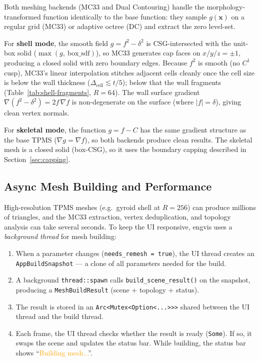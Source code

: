 \documentclass[11pt]{article}
\begin{document}
Both meshing backends (MC33 and Dual Contouring) handle the
morphology-transformed function identically to the base function:
they sample $g(\mathbf{x})$ on a regular grid (MC33) or adaptive
octree (DC) and extract the zero level-set.

For \textbf{shell mode}, the smooth field $g = f^2-\delta^2$ is
CSG-intersected with the unit-box solid
($\max(g,\ \text{box\_sdf})$), so MC33 generates cap faces on
$x/y/z = \pm 1$, producing a closed solid with zero boundary edges.
Because $f^2$ is smooth (no $C^1$ cusp), MC33's linear interpolation
stitches adjacent cells cleanly once the cell size is below the wall
thickness ($\Delta_{\text{cell}} \lesssim t/5$); below that the wall
fragments (Table~\ref{tab:shell-fragments}, $R=64$).  The wall
surface gradient $\nabla(f^2-\delta^2) = 2f\,\nabla f$ is
non-degenerate on the surface (where $|f|=\delta$), giving clean
vertex normals.

For \textbf{skeletal mode}, the function $g = f - C$ has the same
gradient structure as the base TPMS ($\nabla g = \nabla f$), so both
backends produce clean results.  The skeletal mesh is a closed solid
(box-CSG), so it uses the boundary capping described in
Section~\ref{sec:capping}.

\subsection{Async Mesh Building and Performance}\label{sec:async}

High-resolution TPMS meshes (e.g.\ gyroid shell at $R=256$) can produce
millions of triangles, and the MC33 extraction, vertex deduplication,
and topology analysis can take several seconds.  To keep the UI
responsive, engvis uses a \emph{background thread} for mesh building:

\begin{enumerate}[leftmargin=2em]
  \item When a parameter changes (\texttt{needs\_remesh = true}), the
        UI thread creates an \texttt{AppBuildSnapshot} --- a clone of
        all parameters needed for the build.
  \item A background \texttt{thread::spawn} calls
        \texttt{build\_scene\_result()} on the snapshot, producing a
        \texttt{MeshBuildResult} (scene + topology + status).
  \item The result is stored in an \texttt{Arc<Mutex<Option<...>>>}
        shared between the UI thread and the build thread.
  \item Each frame, the UI thread checks whether the result is ready
        (\texttt{Some}).  If so, it swaps the scene and updates the
        status bar.  While building, the status bar shows
        ``\textcolor{orange}{Building mesh...}''.
\end{enumerate}
\end{document}
